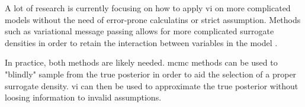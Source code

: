 A lot of research is currently focusing on how to apply \acrshort{vi} on more complicated models without the need of error-prone calculatins or strict assumption. Methods such as variational message passing allows for more complicated surrogate densities in order to retain the interaction between variables in the model \cite{winnbishop}. 

In practice, both methods are likely needed. \acrshort{mcmc} methods can be used to "blindly" sample from the true posterior in order to aid the selection of a proper surrogate density. \acrshort{vi} can then be used to approximate the true posterior without loosing information to invalid assumptions. 

\section{}

